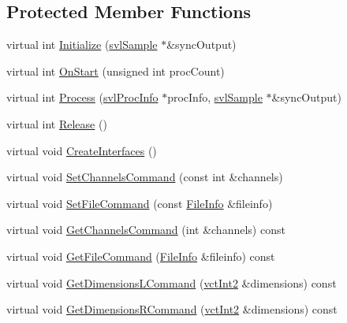 \subsection*{Protected Member Functions}
\begin{DoxyCompactItemize}
\item 
virtual int \hyperlink{classsvl_filter_source_image_file_a68e9c26e989e81754020510d247a2438}{Initialize} (\hyperlink{classsvl_sample}{svl\+Sample} $\ast$\&sync\+Output)
\item 
virtual int \hyperlink{classsvl_filter_source_image_file_ade1a6e0aa1f595bfdaead9e300e9b4c7}{On\+Start} (unsigned int proc\+Count)
\item 
virtual int \hyperlink{classsvl_filter_source_image_file_ad0ce8bdd63a6ac12a0af408fc6570d29}{Process} (\hyperlink{structsvl_proc_info}{svl\+Proc\+Info} $\ast$proc\+Info, \hyperlink{classsvl_sample}{svl\+Sample} $\ast$\&sync\+Output)
\item 
virtual int \hyperlink{classsvl_filter_source_image_file_ac308b049ec61edf88ec775e324ffb7b0}{Release} ()
\item 
virtual void \hyperlink{classsvl_filter_source_image_file_acf8b49f04aad025c610f70ee310761e0}{Create\+Interfaces} ()
\item 
virtual void \hyperlink{classsvl_filter_source_image_file_a048a691c74bc136f4a5ef74c772c1274}{Set\+Channels\+Command} (const int \&channels)
\item 
virtual void \hyperlink{classsvl_filter_source_image_file_a8af078d145fb198b98663a5826f84bc9}{Set\+File\+Command} (const \hyperlink{classsvl_filter_source_image_file_a0acade731f76b2a1adc5a6a43417c4f4}{File\+Info} \&fileinfo)
\item 
virtual void \hyperlink{classsvl_filter_source_image_file_a49726860e3580b2a6fc341a1d09d0c03}{Get\+Channels\+Command} (int \&channels) const 
\item 
virtual void \hyperlink{classsvl_filter_source_image_file_a1c7995d00bffc2c57fe2179fabc98b6e}{Get\+File\+Command} (\hyperlink{classsvl_filter_source_image_file_a0acade731f76b2a1adc5a6a43417c4f4}{File\+Info} \&fileinfo) const 
\item 
virtual void \hyperlink{classsvl_filter_source_image_file_a2f79506c73cd1aa2cbf85c8a74f84402}{Get\+Dimensions\+L\+Command} (\hyperlink{vct_fixed_size_vector_types_8h_add8c88eb6a432b15f14b866b9c35325f}{vct\+Int2} \&dimensions) const 
\item 
virtual void \hyperlink{classsvl_filter_source_image_file_a060f53401080afa2882e8c33cd9faba3}{Get\+Dimensions\+R\+Command} (\hyperlink{vct_fixed_size_vector_types_8h_add8c88eb6a432b15f14b866b9c35325f}{vct\+Int2} \&dimensions) const 
\end{DoxyCompactItemize}
